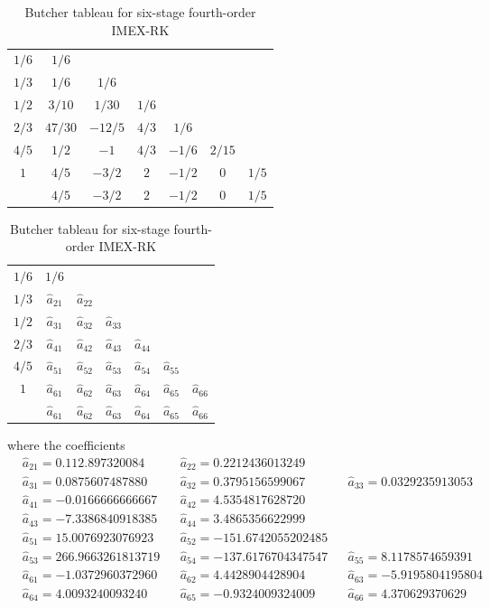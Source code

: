 \documentclass[a4paper, oneside]{book}
\begin{document}
{\begin{table}[h]
    \centering
    \begin{tabular}[h]{c|cccccc}
        $1/6$ & $1/6$  \\
        $1/3$ & $1/6$ & $1/6$    \\
        $1/2$ & $3/10$ & $1/30$  &$1/6$ \\
        $2/3$ & $47/30$ & $-12/5$  &$4/3$ & $1/6$ \\
        $4/5$ & $1/2$ & $-1$  &$4/3$ & $-1/6$  &$2/15$\\
        $1    $ & $4/5$ & $-3/2$  &$2$ & $-1/2$ &$0$  &$1/5$\\
        \hline
        ~ &  $4/5$ & $-3/2$  &$2$ & $-1/2$ &$0$  &$1/5$\\
    \end{tabular}
    \begin{tabular}[h]{c|cccccc}
        $1/6$ & $1/6$ \\
        $1/3$ &  $\hat{a}_{21}$ & $\hat{a}_{22}$  \\
        $1/2$ &  $\hat{a}_{31}$ & $\hat{a}_{32}$  & $\hat{a}_{33}$ \\
        $2/3$ &  $\hat{a}_{41}$ & $\hat{a}_{42}$  & $\hat{a}_{43}$ & $\hat{a}_{44}$ \\
        $4/5$ &  $\hat{a}_{51}$ & $\hat{a}_{52}$  & $\hat{a}_{53}$ & $\hat{a}_{54}$ & $\hat{a}_{55}$ \\
        $1    $ &  $\hat{a}_{61}$ & $\hat{a}_{62}$  & $\hat{a}_{63}$ & $\hat{a}_{64}$ & $\hat{a}_{65}$ & $\hat{a}_{66}$ \\
        \hline
        ~ &  $\hat{a}_{61}$ & $\hat{a}_{62}$  & $\hat{a}_{63}$ & $\hat{a}_{64}$ & $\hat{a}_{65}$ & $\hat{a}_{66}$ \\
    \end{tabular}
    \caption{Butcher tableau for six-stage fourth-order IMEX-RK}\label{tab:imex4}
\end{table}
where the coefficients
\begin{align*}
& \hat{a}_{21} = 0.112.897320084 & &\hat{a}_{22} = 0.2212436013249\\
& \hat{a}_{31} = 0.0875607487880 && \hat{a}_{32} = 0.3795156599067 && \hat{a}_{33} = 0.0329235913053\\
& \hat{a}_{41} = -0.0166666666667 && \hat{a}_{42} = 4.5354817628720 \\
& \hat{a}_{43} = -7.3386840918385 && \hat{a}_{44} = 3.4865356622999 \\
& \hat{a}_{51} = 15.0076923076923 && \hat{a}_{52} = -151.6742055202485\\
& \hat{a}_{53} = 266.9663261813719 && \hat{a}_{54} = -137.6176704347547 && \hat{a}_{55} =8.1178574659391\\
& \hat{a}_{61} = -1.0372960372960 && \hat{a}_{62} = 4.4428904428904  &&\hat{a}_{63} = -5.9195804195804 \\
& \hat{a}_{64} = 4.0093240093240 && \hat{a}_{65} =-0.9324009324009 && \hat{a}_{66} =4.370629370629\
\end{align*}


}
\end{document}
